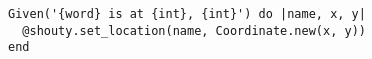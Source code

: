 \begin{verbatim}
Given('{word} is at {int}, {int}') do |name, x, y|
  @shouty.set_location(name, Coordinate.new(x, y))
end
\end{verbatim}
